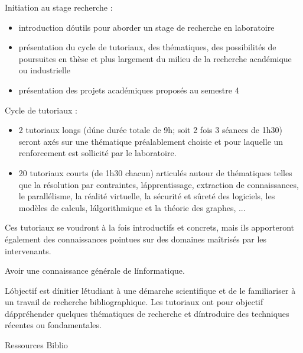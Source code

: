 {
Initiation au stage recherche :
\begin{itemize}
\item introduction d\'outils pour aborder un stage de recherche en laboratoire
\item présentation du cycle de tutoriaux, des thématiques, des possibilités de poursuites en thèse et plus largement du milieu de la recherche académique ou industrielle
\item présentation des projets académiques proposés au semestre 4
\end{itemize} 
Cycle de tutoriaux :
\begin{itemize}
\item 2 tutoriaux longs (d\'une durée totale de 9h; soit 2 fois 3 séances de 1h30) seront axés sur une thématique préalablement
choisie et pour laquelle un renforcement est sollicité par le laboratoire.
\item 20 tutoriaux courts (de 1h30 chacun) articulés autour de thématiques telles que la résolution par contraintes,
l\'apprentissage, extraction de connaissances, le parallélisme, la réalité virtuelle, la sécurité et sûreté des logiciels,
les modèles de calculs, l\'algorithmique et la théorie des graphes, ...
\end{itemize} 
Ces tutoriaux se voudront à la fois introductifs et concrets, mais ils apporteront également des connaissances pointues sur des domaines maîtrisés par les intervenants. 
}
{Avoir une connaissance générale de l\'informatique.}
{\begin{itemize}
\ObjItem L\'objectif est d\'initier l\'étudiant à une démarche scientifique et de le familiariser à un travail de recherche bibliographique. 
\ObjItem Les tutoriaux ont pour objectif d\'appréhender quelques thématiques de recherche et d\'introduire des techniques récentes ou fondamentales.
\end{itemize} 
} 
{Ressources} 
{Biblio} 
 

